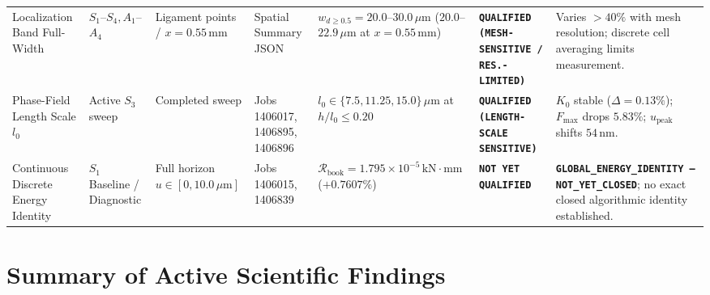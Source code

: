 \begin{table}[htbp]
\begin{tabularx}{\textwidth}{p{2.2cm}p{1.4cm}p{1.8cm}p{1.7cm}p{2.3cm}p{1.8cm}X}
Localization Band Full-Width & $S_1$--$S_4, A_1$--$A_4$ & Ligament points / $x = 0.55\,\mathrm{mm}$ & Spatial Summary JSON & $w_{d \ge 0.5} = 20.0$--$30.0\,\mu\mathrm{m}$ ($20.0$--$22.9\,\mu\mathrm{m}$ at $x=0.55\,\mathrm{mm}$) & \textbf{\texttt{QUALIFIED (MESH-SENSITIVE / RES.-LIMITED)}} & Varies $>40\%$ with mesh resolution; discrete cell averaging limits measurement. \\
Phase-Field Length Scale $l_0$ & Active $S_3$ sweep & Completed sweep & Jobs 1406017, 1406895, 1406896 & $l_0 \in \{7.5, 11.25, 15.0\}\,\mu\mathrm{m}$ at $h/l_0 \le 0.20$ & \textbf{\texttt{QUALIFIED (LENGTH-SCALE SENSITIVE)}} & $K_0$ stable ($\Delta=0.13\%$); $F_{\max}$ drops $5.83\%$; $u_{\mathrm{peak}}$ shifts $54\,\mathrm{nm}$. \\
Continuous Discrete Energy Identity & $S_1$ Baseline / Diagnostic & Full horizon $u \in [0, 10.0\,\mu\mathrm{m}]$ & Jobs 1406015, 1406839 & $\mathcal{R}_{\mathrm{book}} = 1.795\times 10^{-5}\,\mathrm{kN\cdot mm}$ ($+0.7607\%$) & \textbf{\texttt{NOT YET QUALIFIED}} & \textbf{\texttt{GLOBAL\_ENERGY\_IDENTITY --- NOT\_YET\_CLOSED}}; no exact closed algorithmic identity established. \\
\bottomrule
\end{tabularx}
\end{table}

\section{Summary of Active Scientific Findings}
\label{sec:findings_summary}

